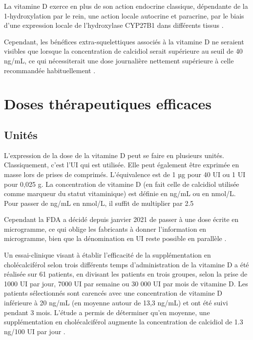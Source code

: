 \documentclass[
  a4paper,
  DIV=11,
  numbers=noendperiod,
  listof=totoc]{scrreprt}
\begin{document}
La vitamine D exerce en plus de son action endocrine classique,
dépendante de la 1-hydroxylation par le rein, une action locale
autocrine et paracrine, par le biais d'une expression locale de
l'hydroxylase \ac{CYP27B1} dans différents tissus
\autocite{Carmeliet.2015,Cannell.2008}.

Cependant, les bénéfices extra-squelettiques associés à la vitamine D ne
seraient visibles que lorsque la concentration de calcidiol serait
supérieure au seuil de 40 ng/mL, ce qui nécessiterait une dose
journalière nettement supérieure à celle recommandée habituellement
\autocite{Caprio.2017}.

\hypertarget{doses-thuxe9rapeutiques-efficaces}{%
\section{Doses thérapeutiques
efficaces}\label{doses-thuxe9rapeutiques-efficaces}}

\hypertarget{unituxe9s}{%
\subsection{Unités}\label{unituxe9s}}

L'expression de la dose de la vitamine D peut se faire en plusieurs
unités. Classiquement, c'est l'\ac{UI} qui est utilisée. Elle peut
également être exprimée en masse lors de prises de comprimés.
L'équivalence est de 1 µg pour 40 \ac{UI} ou 1 \ac{UI} pour 0,025 g. La
concentration de vitamine D (en fait celle de calcidiol utilisée comme
marqueur du statut vitaminique) est définie en ng/mL ou en nmol/L. Pour
passer de ng/mL en nmol/L, il suffit de multiplier par 2.5
\autocite{Pramyothin.2012}

Cependant la \ac{FDA} a décidé depuis janvier 2021 de passer à une dose
écrite en microgramme, ce qui oblige les fabricants à donner
l'information en microgramme, bien que la dénomination en UI reste
possible en parallèle \autocite{HHS.2016}.

Un essai-clinique visant à établir l'efficacité de la supplémentation en
cholécalciférol selon trois différents temps d'administration de la
vitamine D a été réalisée sur 61 patients, en divisant les patients en
trois groupes, selon la prise de 1000 UI par jour, 7000 UI par semaine
ou 30 000 UI par mois de vitamine D. Les patients sélectionnés sont
carencés avec une concentration de vitamine D inférieure à 20 ng/mL (en
moyenne autour de 13,3 ng/mL) et ont été suivi pendant 3 mois. L'étude a
permis de déterminer qu'en moyenne, une supplémentation en
cholécalciférol augmente la concentration de calcidiol de 1.3 ng/100 UI
par jour \autocite{Takács.2017}.
\end{document}
